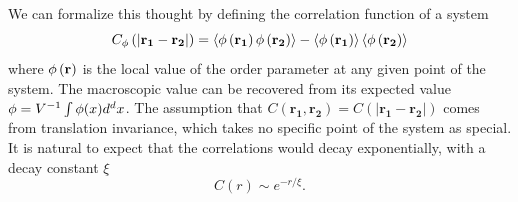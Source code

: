 We can formalize this thought by defining the correlation function of a system
\begin{equation}
    \label{eq:corr0}
    C_{\phi}\left(\left|\mathbf{r_1}-\mathbf{r_2}\right|\right) = 
    \left\langle
        \phi\left(\mathbf{r_{1}}\right)
        \phi\left(\mathbf{r_{2}}\right)
    \right\rangle -
    \left\langle
        \phi\left(\mathbf{r_{1}}\right)
    \right\rangle
    \left\langle
        \phi\left(\mathbf{r_{2}}\right)
    \right\rangle
\end{equation}
where $\phi\left(\mathbf{r}\right)$ is the local value of the order parameter at
any given point of the system. The macroscopic value can be recovered from its
expected value $\phi=V^{-1}\int\phi(x)d^d x$. The assumption that
$C\left(\mathbf{r_1},\mathbf{r_{2}}\right) =
C\left(\left|\mathbf{r_{1}}-\mathbf{r_{2}}\right|\right)$ comes from
translation invariance, which takes no specific point of the system as special.
It is natural to expect that the correlations would decay exponentially, with a
decay constant $\xi$
\begin{equation}
    \label{eq:corr}
    C\left(r\right)\sim e^{-r/\xi}.
\end{equation}

